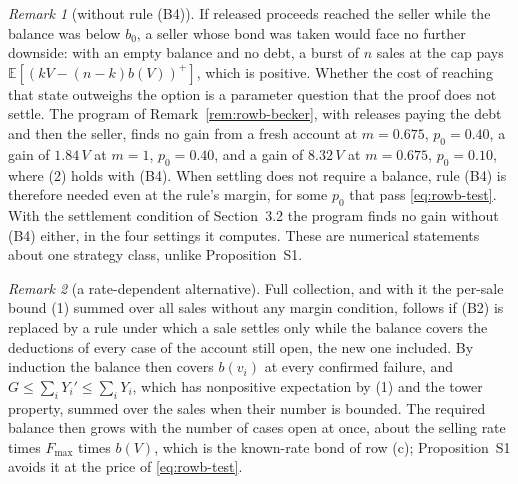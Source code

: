 \documentclass[10pt,a4paper]{article}
\newcommand{\Fmax}{F_{\max}}
\newcommand{\E}{\mathbb{E}}
\theoremstyle{plain}
\theoremstyle{remark}
\newtheorem{sremark}{Remark}
\begin{document}
\begin{sremark}[without rule (B4)]\label{rem:rowb-refill}
If released proceeds reached the seller while the balance was below $b_0$, a seller whose bond was taken would face no further downside: with an empty balance and no debt, a burst of $n$ sales at the cap pays $\E[(kV-(n-k)b(V))^+]$, which is positive. Whether the cost of reaching that state outweighs the option is a parameter question that the proof does not settle. The program of Remark~\ref{rem:rowb-becker}, with releases paying the debt and then the seller, finds no gain from a fresh account at $m=0.675$, $p_0=0.40$, a gain of $1.84\,V$ at $m=1$, $p_0=0.40$, and a gain of $8.32\,V$ at $m=0.675$, $p_0=0.10$, where (2) holds with (B4). When settling does not require a balance, rule (B4) is therefore needed even at the rule's margin, for some $p_0$ that pass \eqref{eq:rowb-test}. With the settlement condition of Section~3.2 the program finds no gain without (B4) either, in the four settings it computes. These are numerical statements about one strategy class, unlike Proposition~S1.
\end{sremark}

\begin{sremark}[a rate-dependent alternative]\label{rem:rowb-pending}
Full collection, and with it the per-sale bound (1) summed over all sales without any margin condition, follows if (B2) is replaced by a rule under which a sale settles only while the balance covers the deductions of every case of the account still open, the new one included. By induction the balance then covers $b(v_i)$ at every confirmed failure, and $G\le\sum_iY_i'\le\sum_iY_i$, which has nonpositive expectation by (1) and the tower property, summed over the sales when their number is bounded. The required balance then grows with the number of cases open at once, about the selling rate times $\Fmax$ times $b(V)$, which is the known-rate bond of row (c); Proposition~S1 avoids it at the price of \eqref{eq:rowb-test}.
\end{sremark}
\end{document}
